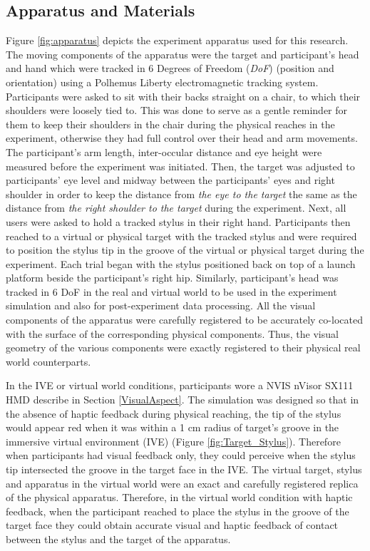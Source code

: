 \subsection{Apparatus and Materials} \label{generalSetup}
Figure \ref{fig:apparatus} depicts the experiment apparatus used for this research. The moving components of the apparatus were the target and participant's head and hand which were tracked in 6 Degrees of Freedom (\textit{DoF}) (position and orientation) using a Polhemus Liberty electromagnetic tracking system. Participants were asked to sit with their backs straight on a chair, to which their shoulders were loosely tied to. This was done to serve as a gentle reminder for them to keep their shoulders in the chair during the physical reaches in the experiment, otherwise they had full control over their head and arm movements. The participant's arm length, inter-occular distance and eye height were measured before the experiment was initiated. Then, the target was adjusted to participants' eye level and midway between the participants' eyes and right shoulder in order to keep the distance from \textit{the eye to the target} the same as the distance from \textit{the right shoulder to the target} during the experiment. Next, all users were asked to hold a tracked stylus in their right hand. Participants then reached to a virtual or physical target with the tracked stylus and were required to position the stylus tip in the groove of the virtual or physical target during the experiment. Each trial began with the stylus positioned back on top of a launch platform beside the participant's right hip. Similarly, participant's head was tracked in 6 DoF in the real and virtual world to be used in the experiment simulation and also for post-experiment data processing. All the visual components of the apparatus were carefully registered to be accurately co-located with the surface of the corresponding physical components. Thus, the visual geometry of the various components were exactly registered to their physical real world counterparts. 

In the IVE or virtual world conditions, participants wore a NVIS nVisor SX111 HMD describe in Section \ref{VisualAspect}. The simulation was designed so that in the absence of haptic feedback during physical reaching, the tip of the stylus would appear red when it was within a 1 cm radius of target's groove in the immersive virtual environment (IVE) (Figure \ref{fig:Target_Stylus}). Therefore when participants had visual feedback only, they could perceive when the stylus tip intersected the groove in the target face in the IVE. The virtual target, stylus and apparatus in the virtual world were an exact and carefully registered replica of the physical apparatus. Therefore, in the virtual world condition with haptic feedback, when the participant reached to place the stylus in the groove of the target face they could obtain accurate visual and haptic feedback of contact between the stylus and the target of the apparatus. 

